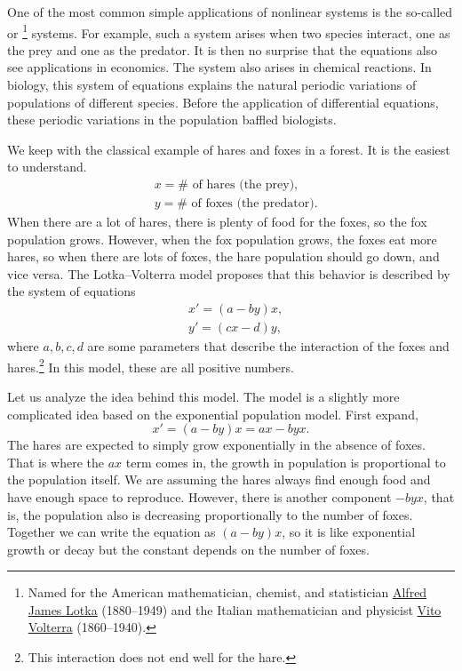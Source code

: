 One of the most common simple applications of nonlinear systems is the
so-called \emph{} or
\emph{}%
\footnote{Named for the American mathematician, chemist, and statistician
\href{https://en.wikipedia.org/wiki/Alfred_J._Lotka}{Alfred James Lotka}
(1880--1949) and the Italian mathematician and physicist
\href{https://en.wikipedia.org/wiki/Vito_Volterra}{Vito Volterra}
(1860--1940).}
systems.  For example, such a system arises
when two species interact, one as the prey and one as the predator.  It is
then no surprise that the equations also see applications in economics.
The system also arises in chemical reactions.
In biology, this system of equations explains the natural periodic variations of populations of
different species.  Before the application of differential
equations, these periodic variations in the population baffled biologists.

We keep
with the classical example of hares and foxes in a forest.
It is the
easiest to understand.
\begin{equation*}
\begin{aligned}
& x = \# \text{ of hares (the prey),} \\
& y = \# \text{ of foxes (the predator).}
\end{aligned}
\end{equation*}
When there are a lot of hares, there is plenty of food for the foxes, so
the fox population grows.  However, when the fox population grows, the foxes
eat more hares, so when there are lots of foxes, the hare population
should go down, and vice versa.
The Lotka--Volterra model proposes that this 
behavior is described by the system of equations
\begin{equation*}
\begin{aligned}
& x' = (a-by)x, \\
& y' = (cx-d)y,
\end{aligned}
\end{equation*}
where $a,b,c,d$ are some parameters that describe the interaction of the
foxes and hares.\footnote{This interaction does not end well for the
hare.}  In this model, these are all positive numbers.

Let us analyze the idea behind this model.  The model is a slightly more
complicated idea based on the exponential population model.
First expand,
\begin{equation*}
x' = (a-by)x = ax - byx .
\end{equation*}
The hares are expected to simply grow exponentially in the absence of foxes.
That is where the $ax$ term comes in, the growth in population is
proportional to the population itself.  We are assuming the hares
always find enough food and have enough space to reproduce.  However,
there is another component $-byx$, that is, the population also is
decreasing proportionally to the number of foxes.  Together we can write the
equation as $(a-by)x$, so it is like exponential growth or decay but the
constant depends on the number of foxes.

